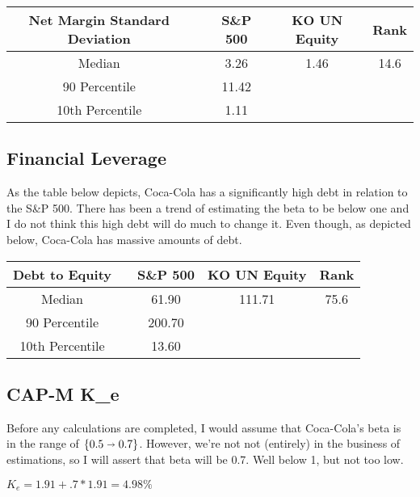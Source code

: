 \documentclass[11pt,letterpaper,english]{article}
\begin{document}
\begin{table}[h]
\centering
\begin{tabular}{|c|c|c|c|c|}
\hline
Net Margin Standard Deviation  &  & S\&P 500 & KO UN Equity & Rank \\ \hline
Median     &  & 3.26     & 1.46         & 14.6 \\ \hline
90 Percentile   &  & 11.42     &              &      \\ \hline
10th Percentile &  & 1.11     &              &      \\ \hline
\end{tabular}
\end{table}

\subsection*{Financial Leverage}
As the table below depicts, Coca-Cola has a significantly high debt in relation to the S\&P 500.
There has been a trend of estimating the beta to be below one and I do not think this high debt
will do much to change it. Even though, as depicted below, Coca-Cola has massive amounts of debt.

\begin{table}[h]
\centering
\begin{tabular}{|c|c|c|c|c|}
\hline
Debt to Equity  &  & S\&P 500 & KO UN Equity & Rank \\ \hline
Median          &  & 61.90    & 111.71       & 75.6 \\ \hline
90 Percentile   &  & 200.70   &              &      \\ \hline
10th Percentile &  & 13.60    &              &      \\ \hline
\end{tabular}
\end{table}

\subsection*{CAP-M K_e}
Before any calculations are completed, I would assume that Coca-Cola's beta is in the range of
$\{0.5 \shortrightarrow 0.7\}$. However, we're not not (entirely) in the business of estimations,
so I will assert that beta will be 0.7. Well below 1, but not too low.

\begin{center}
$K_e = 1.91 + .7 * 1.91 = 4.98\%$
\end{center}
\end{document}
